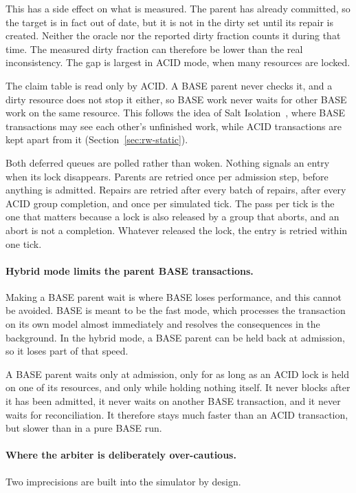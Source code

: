 This has a side effect on what is measured. The parent has already committed,
so the target is in fact out of date, but it is not in the dirty set until its
repair is created. Neither the oracle nor the reported dirty fraction counts it
during that time. The measured dirty fraction can therefore be lower than the
real inconsistency. The gap is largest in ACID mode, when many resources are
locked.

The claim table is read only by ACID. A BASE parent never checks it, and a
dirty resource does not stop it either, so BASE work never waits for other
BASE work on the same resource. This follows the idea of Salt
Isolation~\cite{xie2014salt}, where BASE transactions may see each other's
unfinished work, while ACID transactions are kept apart from it
(Section~\ref{sec:rw-static}).

Both deferred queues are polled rather than woken. Nothing signals an entry
when its lock disappears. Parents are retried once per admission step, before
anything is admitted. Repairs are retried after every batch of repairs, after
every ACID group completion, and once per simulated tick. The pass per tick
is the one that matters because a lock is also released by a group that
aborts, and an abort is not a completion. Whatever released the lock, the
entry is retried within one tick.

\paragraph{Hybrid mode limits the parent BASE
  transactions.}\label{sec:approach-base-cost} Making a BASE parent wait is
where BASE loses performance, and this cannot be avoided. BASE is meant to be
the fast mode, which processes the transaction on its own model almost
immediately and resolves the consequences in the background. In the hybrid
mode, a BASE parent can be held back at admission, so it loses part of that
speed.

A BASE parent waits only at admission, only for as long as an ACID lock is
held on one of its resources, and only while holding nothing itself. It
never blocks after it has been admitted, it never waits on another BASE
transaction, and it never waits for reconciliation. It therefore stays much
faster than an ACID transaction, but slower than in a pure BASE run.

\paragraph{Where the arbiter is deliberately
  over-cautious.}\label{sec:approach-conservatism} Two imprecisions are
built into the simulator by design.

